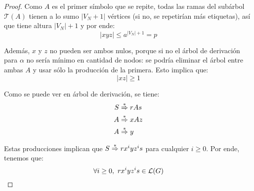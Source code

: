 \begin{proof}
    Como $A$ es el primer símbolo que se repite, todas las ramas del subárbol $\mathcal T(A)$ tienen a lo sumo $|V_N + 1|$ vértices (si no, se repetirían más etiquetas), así que tiene altura $|V_N| + 1$ y por ende:
    $$
        |xyz| \leq a^{|V_N| + 1} = p
    $$

    Además, $x$ y $z$ no pueden ser ambos nulos, porque si no el árbol de derivación para $\alpha$ no sería mínimo en cantidad de nodos: se podría eliminar el árbol entre ambas $A$ y usar sólo la producción de la primera. Esto implica que:
    $$
        |xz| \geq 1
    $$

    Como se puede ver en árbol de derivación, se tiene:
    $$
    \begin{aligned}
        S & \overset{*}{\Rightarrow} rAs \\
        A & \overset{*}{\Rightarrow} xAz \\
        A & \overset{*}{\Rightarrow} y
    \end{aligned}
    $$

    Estas producciones implican que $S \overset{*}{\Rightarrow} r x^i y z^i s$ para cualquier $i \geq 0$. Por ende, tenemos que:
    $$
        \forall i \geq 0,\ r x^i y z^i s \in \mathcal{L}(G)
    $$
\end{proof}
